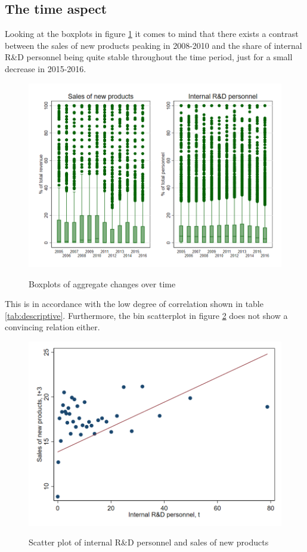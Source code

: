 \subsection{The time aspect}
\label{subsec:time}
Looking at the boxplots in figure \ref{fig:box} it comes to mind that there exists a contrast between the sales of new products peaking in 2008-2010 and the share of internal R\&D personnel being quite stable throughout the time period, just for a small decrease in 2015-2016.
\begin{figure}[H]
  \centering
  \caption{Boxplots of aggregate changes over time}
    \includegraphics[width=1.0 \textwidth]{03_figures/combined}
  \label{fig:box}
\end{figure}
This is in accordance with the low degree of correlation shown in table \ref{tab:descriptive}. Furthermore, the bin scatterplot in figure \ref{fig:bin} does not show a convincing relation either.

\begin{figure}[H]
  \centering
  \caption{Scatter plot of internal R\&D personnel and sales of new products}
    \includegraphics[width=1.0 \textwidth]{03_figures/scatter}
  \label{fig:bin}
\end{figure}
